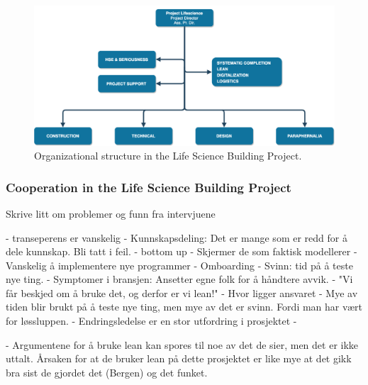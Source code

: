 \begin{figure}
    \centering
    \includegraphics[width=\textwidth]{fig/lvb_diagram.png}
    \caption{Organizational structure in the Life Science Building Project.}
    \label{fig:project_structure}
\end{figure}

\subsubsection{Cooperation in the Life Science Building Project}

Skrive litt om problemer og funn fra intervjuene

- transeperens er vanskelig
    - Kunnskapsdeling: Det er mange som er redd for å dele kunnskap. Bli tatt i feil. 
- bottom up - Skjermer de som faktisk modellerer
- Vanskelig å implementere nye programmer - Omboarding
- Svinn: tid på å teste nye ting.
    - Symptomer i bransjen: Ansetter egne folk for å håndtere avvik.
- "Vi får beskjed om å bruke det, og derfor er vi lean!"
- Hvor ligger ansvaret
- Mye av tiden blir brukt på å teste nye ting, men mye av det er svinn. Fordi man har vært for løssluppen. 
- Endringsledelse er en stor utfordring i prosjektet
- 

- Argumentene for å bruke lean kan spores til noe av det de sier, men det er ikke uttalt. Årsaken for at de bruker lean på dette prosjektet er like mye at det gikk bra sist de gjordet det (Bergen) og det funket. 


\cleardoublepage